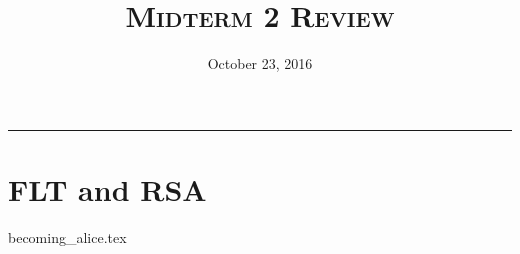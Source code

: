 \documentclass{exam}
\title{\textsc{Midterm 2 Review}}
\date{October 23, 2016}
\begin{document}
\maketitle
\rule{\textwidth}{0.15em}
\fontsize{12}{15}\selectfont
\thispagestyle{empty}

\section{FLT and RSA}
\begin{questions}
{becoming_alice.tex}
\end{questions}




\end{document}
